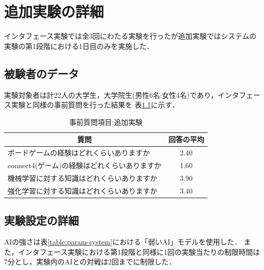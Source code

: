 \chapter{追加実験の詳細}
\label{chap:system}
インタフェース実験では全3回にわたる実験を行ったが追加実験ではシステムの実験の第1段階における1日目のみを実施した．
\section{被験者のデータ}
実験対象者は計22人の大学生，大学院生(男性6名:女性4名)であり，インタフェース実験と同様の事前質問を行った結果を
表\ref{table:before-extra}に示す．


\begin{table}[H]
    \caption{事前質問項目:追加実験}
    \label{table:before-extra}
	\scriptsize
    \begin{tabular}{l||c}
        \multicolumn{1}{c|}{質問} & 回答の平均\\ \hline \hline
        ボードゲームの経験はどれくらいありますか & 2.40\\
        connect4(ゲーム)の経験はどれくらいありますか& 1.60\\\hline
        機械学習に対する知識はどれくらいありますか& 3.90\\
        強化学習に対する知識はどれくらいありますか& 3.40\\
    \end{tabular}
    
\end{table}
\section{実験設定の詳細}
AIの強さは表\ref{table:param-system}における「弱いAI」モデルを使用した．
また，インタフェース実験における第1段階と同様に1回の実験当たりの制限時間は7分とし，実験内のAIとの対戦は2回までに制限した．

